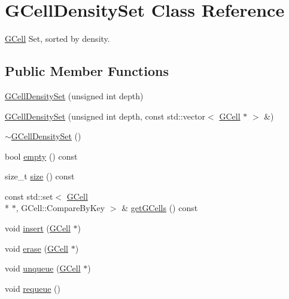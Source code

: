 \hypertarget{classKatabatic_1_1GCellDensitySet}{\section{G\-Cell\-Density\-Set Class Reference}
\label{classKatabatic_1_1GCellDensitySet}
}


\hyperlink{classKatabatic_1_1GCell}{G\-Cell} Set, sorted by density.  


\subsection*{Public Member Functions}
\begin{DoxyCompactItemize}
\item 
\hyperlink{classKatabatic_1_1GCellDensitySet_ad74cbb404ad28f734f5759462aa9f363}{G\-Cell\-Density\-Set} (unsigned int depth)
\item 
\hyperlink{classKatabatic_1_1GCellDensitySet_ada8d6c973310b9c4f66ec3c5b611bdf9}{G\-Cell\-Density\-Set} (unsigned int depth, const std\-::vector$<$ \hyperlink{classKatabatic_1_1GCell}{G\-Cell} $\ast$ $>$ \&)
\item 
\hyperlink{classKatabatic_1_1GCellDensitySet_aef015ff8dc7d34fcb907281f71bb0003}{$\sim$\-G\-Cell\-Density\-Set} ()
\item 
bool \hyperlink{classKatabatic_1_1GCellDensitySet_ac6e61de369e994009e36f344f99c15ad}{empty} () const 
\item 
size\-\_\-t \hyperlink{classKatabatic_1_1GCellDensitySet_aac782da1f912bceb5d8ad00c8dc892ac}{size} () const 
\item 
const std\-::set$<$ \hyperlink{classKatabatic_1_1GCell}{G\-Cell} \\*
$\ast$, G\-Cell\-::\-Compare\-By\-Key $>$ \& \hyperlink{classKatabatic_1_1GCellDensitySet_a4ee769ef70539275bf4b500461250af0}{get\-G\-Cells} () const 
\item 
void \hyperlink{classKatabatic_1_1GCellDensitySet_a6b97afb6d814ba80a24a49b3ad8e540b}{insert} (\hyperlink{classKatabatic_1_1GCell}{G\-Cell} $\ast$)
\item 
void \hyperlink{classKatabatic_1_1GCellDensitySet_a743f7f98fe31b8a1c134aff01ba03acb}{erase} (\hyperlink{classKatabatic_1_1GCell}{G\-Cell} $\ast$)
\item 
void \hyperlink{classKatabatic_1_1GCellDensitySet_a89099ec88eadcadb942b7d64a6ffd7ee}{unqueue} (\hyperlink{classKatabatic_1_1GCell}{G\-Cell} $\ast$)
\item 
void \hyperlink{classKatabatic_1_1GCellDensitySet_ac84efe46d8a3c409e85bc3420240c3c2}{requeue} ()
\end{DoxyCompactItemize}


